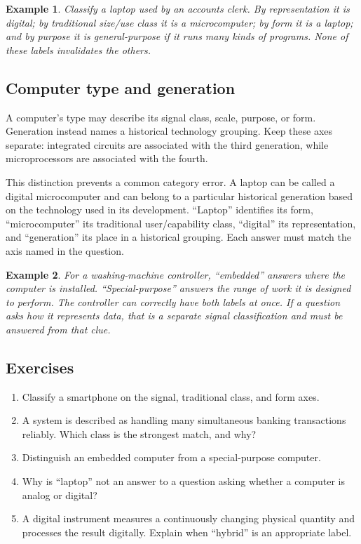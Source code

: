 \documentclass[11pt]{article}
\newtheorem{example}{Example}[section]
\begin{document}
\begin{example}
Classify a laptop used by an accounts clerk. By representation it is digital;
by traditional size/use class it is a microcomputer; by form it is a laptop;
and by purpose it is general-purpose if it runs many kinds of programs.
None of these labels invalidates the others.
\end{example}

\subsection*{Computer type and generation}
A computer's type may describe its signal class, scale, purpose, or form.
Generation instead names a historical technology grouping. Keep these axes
separate: integrated circuits are associated with the third generation,
while microprocessors are associated with the fourth.

This distinction prevents a common category error. A laptop can be called a
digital microcomputer and can belong to a particular historical generation
based on the technology used in its development. ``Laptop'' identifies its
form, ``microcomputer'' its traditional user/capability class, ``digital''
its representation, and ``generation'' its place in a historical grouping.
Each answer must match the axis named in the question.

\begin{example}
For a washing-machine controller, ``embedded'' answers where the computer is
installed. ``Special-purpose'' answers the range of work it is designed to
perform. The controller can correctly have both labels at once. If a
question asks how it represents data, that is a separate signal
classification and must be answered from that clue.
\end{example}

\subsection*{Exercises}
\begin{enumerate}[label=\arabic*.]
  \item Classify a smartphone on the signal, traditional class, and form
    axes.
  \item A system is described as handling many simultaneous banking
    transactions reliably. Which class is the strongest match, and why?
  \item Distinguish an embedded computer from a special-purpose computer.
  \item Why is ``laptop'' not an answer to a question asking whether a
    computer is analog or digital?
  \item A digital instrument measures a continuously changing physical
    quantity and processes the result digitally. Explain when ``hybrid'' is
    an appropriate label.
\end{enumerate}
\end{document}

